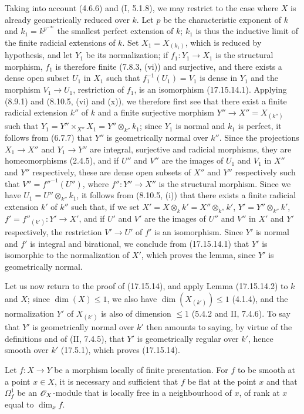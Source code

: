 Taking into account (4.6.6) and (I, 5.1.8), we may restrict to the case where $X$ is already geometrically reduced over $k$. Let $p$ be the characteristic exponent of $k$ and $k_1=k^{p^{-\infty}}$ the smallest perfect extension of $k$; $k_1$ is thus the inductive limit of the finite radicial extensions of $k$. Set $X_1=X_{(k_1)}$, which is reduced by hypothesis, and let $Y_1$ be its normalization; if $f_1:Y_1\to X_1$ is the structural morphism, $f_1$ is therefore finite (7.8.3, (vi)) and surjective, and there exists a dense open subset $U_1$ in $X_1$ such that $f_1^{-1}(U_1)=V_1$ is dense in $Y_1$ and the morphism $V_1\to U_1$, restriction of $f_1$, is an isomorphism (17.15.14.1). Applying (8.9.1) and (8.10.5, (vi) and (x)), we therefore first see that there exist a finite radicial extension $k''$ of $k$ and a finite surjective morphism $Y''\to X''=X_{(k'')}$ such that $Y_1=Y''\times_{X''}X_1=Y''\otimes_{k''}k_1$; since $Y_1$ is normal and $k_1$ is perfect, it follows from (6.7.7) that $Y''$ is geometrically normal over $k''$. Since the projections $X_1\to X''$ and $Y_1\to Y''$ are integral, surjective and radicial morphisms, they are homeomorphisms (2.4.5), and if $U''$ and $V''$ are the images of $U_1$ and $V_1$ in $X''$ and $Y''$ respectively, these are dense open subsets of $X''$ and $Y''$ respectively such that $V''=f''^{-1}(U'')$, where $f'':Y''\to X''$ is the structural morphism. Since we have $U_1=U''\otimes_{k''}k_1$, it follows from (8.10.5, (i)) that there exists a finite radicial extension $k'$ of $k''$ such that, if we set $X'=X\otimes_k k'=X''\otimes_{k''}k'$, $Y'=Y''\otimes_{k''}k'$, $f'=f''_{(k')}:Y'\to X'$, and if $U'$ and $V'$ are the images of $U''$ and $V''$ in $X'$ and $Y'$ respectively, the restriction $V'\to U'$ of $f'$ is an isomorphism. Since $Y'$ is normal and $f'$ is integral and birational, we conclude from (17.15.14.1) that $Y'$ is isomorphic to the normalization of $X'$, which proves the lemma, since $Y'$ is geometrically normal.

Let us now return to the proof of (17.15.14), and apply Lemma (17.15.14.2) to $k$ and $X$; since $\dim(X)\leq1$, we also have $\dim(X_{(k')})\leq1$ (4.1.4), and the normalization $Y'$ of $X_{(k')}$ is also of dimension $\leq1$ (5.4.2 and II, 7.4.6). To say that $Y'$ is geometrically normal over $k'$ then amounts to saying, by virtue of the definitions and of (II, 7.4.5), that $Y'$ is geometrically regular over $k'$, hence smooth over $k'$ (17.5.1), which proves (17.15.14).

\begin{proposition}[17.15.15]
\label{IV.17.15.15}
Let $f:X\to Y$ be a morphism locally of finite presentation. For $f$ to be smooth at a point $x\in X$, it is necessary and sufficient that $f$ be flat at the point $x$ and that $\Omega^1_f$ be an $\mathscr{O}_X$-module that is locally free in a neighbourhood of $x$, of rank at $x$ equal to $\dim_x f$.
\end{proposition}

